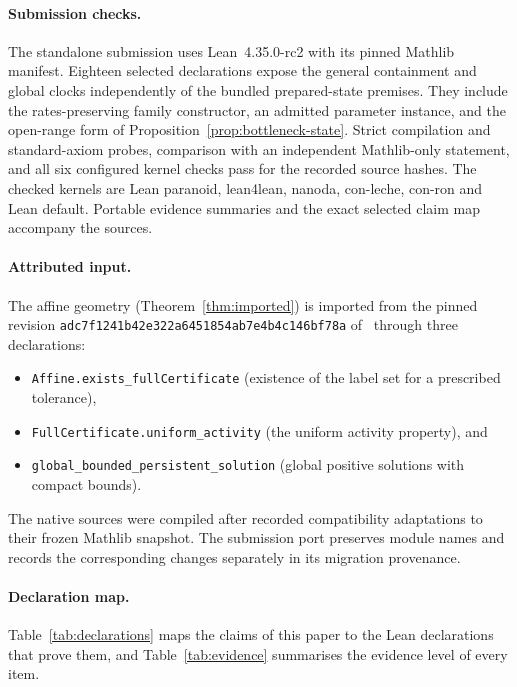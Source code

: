 \documentclass[11pt,a4paper]{article}
\theoremstyle{plain}
\theoremstyle{definition}
\theoremstyle{remark}
\newcommand{\lean}[1]{\texttt{#1}}
\begin{document}
\paragraph{Submission checks.}
The standalone submission uses Lean~4.35.0-rc2 with its pinned Mathlib manifest. Eighteen selected declarations expose the general containment and global clocks independently of the bundled prepared-state premises. They include the rates-preserving family constructor, an admitted parameter instance, and the open-range form of Proposition~\ref{prop:bottleneck-state}. Strict compilation and standard-axiom probes, comparison with an independent Mathlib-only statement, and all six configured kernel checks pass for the recorded source hashes. The checked kernels are Lean paranoid, lean4lean, nanoda, con-leche, con-ron and Lean default. Portable evidence summaries and the exact selected claim map accompany the sources.

\paragraph{Attributed input.}
The affine geometry (Theorem~\ref{thm:imported}) is imported from the pinned revision \lean{adc7f1241b42e322a6451854ab7e4b4c146bf78a} of~\cite{OpenAI2026Formal} through three declarations:
\begin{itemize}
\item \lean{Affine.exists\_fullCertificate} (existence of the label set for a prescribed tolerance),
\item \lean{FullCertificate.uniform\_activity} (the uniform activity property), and
\item \lean{global\_bounded\_persistent\_solution} (global positive solutions with compact bounds).
\end{itemize}
The native sources were compiled after recorded compatibility adaptations to their frozen Mathlib snapshot. The submission port preserves module names and records the corresponding changes separately in its migration provenance.

\paragraph{Declaration map.}
Table~\ref{tab:declarations} maps the claims of this paper to the Lean declarations that prove them, and Table~\ref{tab:evidence} summarises the evidence level of every item.
\end{document}
